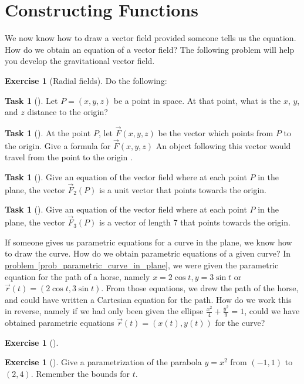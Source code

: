 \documentclass[10pt,]{book}
\theoremstyle{plain}
\theoremstyle{definition}
\theoremstyle{definition}
\theoremstyle{definition}
\theoremstyle{definition}
\newtheorem{exploration}[project]{Exercise}
\newtheorem{task}[project]{Task}
\theoremstyle{definition}
\numberwithin{equation}{section}
\newcommand{\ds}{\displaystyle}
\begin{document}
\section[{Constructing Functions}]{Constructing Functions}\label{section-19}
We now know how to draw a vector field provided someone tells us the equation. How do we obtain an equation of a vector field? The following problem will help you develop the gravitational vector field.%
\begin{exploration}[Radial fields]\label{exploration-121}
Do the following:%
\begin{task}[]\label{task-243}
Let \(P=(x,y,z)\) be a point in space. At that point, what is the \(x\), \(y\), and \(z\) distance to the origin?%
\end{task}
\begin{task}[]\label{task-244}
At the point \(P\), let \(\vec F(x,y,z)\) be the vector which points from \(P\) to the origin.  Give a formula for \(\vec F(x,y,z)\) An object following this vector would travel from the point to the origin%
 .%
\end{task}
\begin{task}[]\label{task-245}
Give an equation of the vector field where at each point \(P\) in the plane, the vector \(\vec F_2(P)\) is a unit vector that points towards the origin.%
\end{task}
\begin{task}[]\label{task-246}
Give an equation of the vector field where at each point \(P\) in the plane, the vector \(\vec F_3(P)\) is a vector of length 7 that points towards the origin.%
\end{task}
\end{exploration}
If someone gives us parametric equations for a curve in the plane, we know how to draw the curve. How do we obtain parametric equations of a given curve? In \hyperref[prob_parametric_curve_in_plane]{problem~\ref{prob_parametric_curve_in_plane}}, we were given the parametric equation for the path of a horse, namely \(x=2\cos t, y=3 \sin t\) or \(\vec r(t)=(2\cos t,3\sin t)\). From those equations, we drew the path of the horse, and could have written a Cartesian equation for the path. How do we work this in reverse, namely if we had only been given the ellipse \(\ds\frac{x^2}{4}+\frac{y^2}{9}=1\), could we have obtained parametric equations \(\vec r(t)=(x(t),y(t))\) for the curve?%
\begin{exploration}[]\label{exploration-122}
\end{exploration}
\begin{exploration}[]\label{exploration-123}
Give a parametrization of the parabola \(y=x^2\) from \((-1,1)\) to \((2,4)\). Remember the bounds for \(t\).%
\end{exploration}
\end{document}
